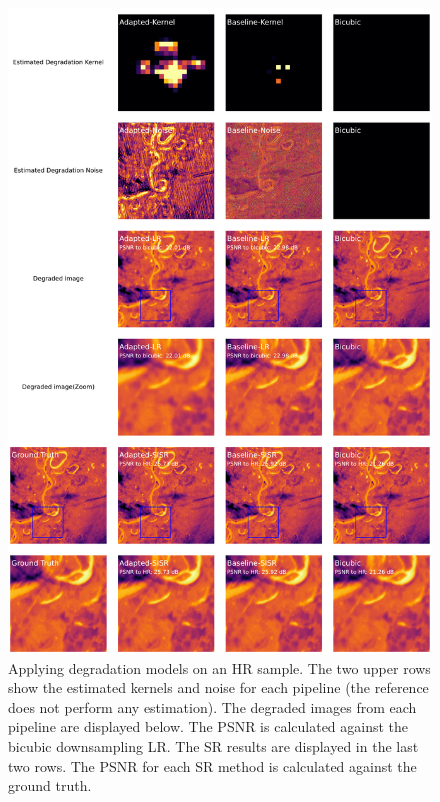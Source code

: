         
        \begin{figure}[H]
            \centering

            \includegraphics[scale=0.29]{Includes/5-source-prediction-sample.pdf}
            \caption{\small{\small{Applying degradation models on an HR sample. The two upper rows show the estimated kernels and noise for each pipeline (the reference does not perform any estimation). The degraded images from each pipeline are displayed below. The PSNR is calculated against the bicubic downsampling LR. The SR results are displayed in the last two rows. The PSNR for each SR method is calculated against the ground truth.}}
            }
            \label{fig:5-source_domain_sample}
        \end{figure}



